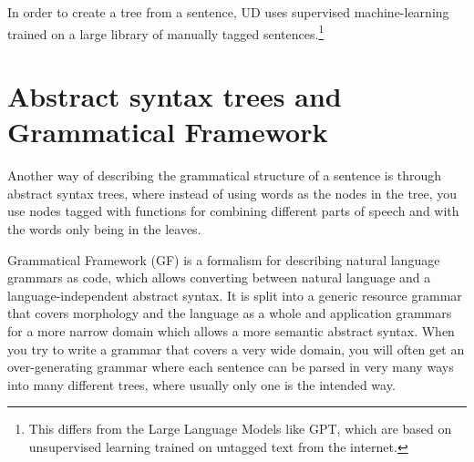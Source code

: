 In order to create a tree from a sentence, UD uses supervised machine-learning trained on a large library of manually tagged sentences.\footnote{This differs from the Large Language Models like GPT, which are based on unsupervised learning trained on untagged text from the internet.}










\section{Abstract syntax trees and Grammatical Framework}

Another way of describing the grammatical structure of a sentence is through abstract syntax trees, where instead of using words as the nodes in the tree, you use nodes tagged with functions for combining different parts of speech and with the words only being in the leaves. 


Grammatical Framework\cite{ranta-2004} (GF) is a formalism for describing natural language grammars as code, which allows converting between natural language and a language-independent abstract syntax. It is split into a generic resource grammar that covers morphology and the language as a whole and application grammars for a more narrow domain which allows a more semantic abstract syntax. When you try to write a grammar that covers a very wide domain, you will often get an over-generating grammar where each sentence can be parsed in very many ways into many different trees, where usually only one is the intended way.

